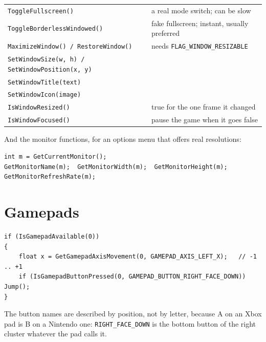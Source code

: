\begin{center}
\begin{tabular}{@{}ll@{}}
\toprule
\lstinline|ToggleFullscreen()| & a real mode switch; can be slow \\
\lstinline|ToggleBorderlessWindowed()| & fake fullscreen; instant, usually preferred \\
\lstinline|MaximizeWindow() / RestoreWindow()| & needs \lstinline|FLAG_WINDOW_RESIZABLE| \\
\lstinline|SetWindowSize(w, h) / SetWindowPosition(x, y)| & \\
\lstinline|SetWindowTitle(text)| & \\
\lstinline|SetWindowIcon(image)| & \\
\lstinline|IsWindowResized()| & true for the one frame it changed \\
\lstinline|IsWindowFocused()| & pause the game when it goes false \\
\bottomrule
\end{tabular}
\end{center}

And the monitor functions, for an options menu that offers real resolutions:

\begin{lstlisting}
int m = GetCurrentMonitor();
GetMonitorName(m);  GetMonitorWidth(m);  GetMonitorHeight(m);  GetMonitorRefreshRate(m);
\end{lstlisting}


\section{Gamepads}

\begin{lstlisting}
if (IsGamepadAvailable(0))
{
    float x = GetGamepadAxisMovement(0, GAMEPAD_AXIS_LEFT_X);   // -1 .. +1
    if (IsGamepadButtonPressed(0, GAMEPAD_BUTTON_RIGHT_FACE_DOWN)) Jump();
}
\end{lstlisting}

The button names are described by position, not by letter, because A on an Xbox
pad is B on a Nintendo one: \lstinline|RIGHT_FACE_DOWN| is the bottom button of
the right cluster whatever the pad calls it.

